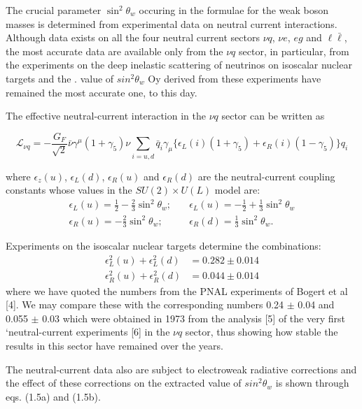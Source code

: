 The crucial parameter $\sin^{2} \theta_{w}$  occuring in the formulae for the weak boson
masses is determined from experimental data on neutral current interactions.
Although data exists on all the four neutral current sectors $\nu {q}$, $\nu {e}$, $e {g}$ and $\ell \bar{\ell}$,
the most accurate data are available only from the $\nu {q}$ sector, in particular,
from the experiments on the deep inelastic scattering of neutrinos on isoscalar
nuclear targets and the . value of $sin^{2} \theta_{w}$ Oy derived from these experiments have remained the most accurate one, to this day.


The effective neutral-current interaction in the $\nu q$ sector can be written as 

\begin{equation*}
 \mathcal{L}_{\nu q} = - \frac{G_{F}}{\sqrt{2}} \bar{\nu} \gamma^{\mu} (1 + \gamma_{5}) \nu \sum_{i=u, d} \bar{q}_{i} \gamma_{\mu} \{\epsilon_{L} (i)(1 + \gamma_{5}) + \epsilon_{R}(i)(1-\gamma_{5})\}q_{i}\tag{4.1}
\end{equation*}

where $\epsilon_{z}(u)$, $\epsilon_{L}(d)$, $\epsilon_{R}(u)$ and $\epsilon_{R}(d)$ are the neutral-current coupling constants
whose values in the $SU(2) \times U(L)$ model are:
\begin{align*}
\epsilon_{L}(u) = \frac{1}{2} - \frac{2}{3} \sin^{2} \theta_{w}; &\quad \epsilon_{L}(u) = -\frac{1}{2} + \frac{1}{3}\sin^{2} \theta_{w}\\
\epsilon_{R}(u) = - \frac{2}{3} \sin^{2} \theta_{w}; &\quad \epsilon_{R}(d) = \frac{1}{3} \sin^{2} \theta_{w}.\tag{4.2}
\end{align*}

Experiments on the isoscalar nuclear targets determine the combinations: 
\begin{align*}
\epsilon_{L}^{2}(u) + \epsilon_{L}^{2}(d) & = 0.282 \pm 0.014\\
\epsilon_{R}^{2}(u) + \epsilon_{R}^{2}(d) & = 0.044 \pm 0.014
\end{align*} 
where we have quoted the numbers from the PNAL experiments of Bogert et
al [4]. We may compare these with the corresponding numbers 0.24 $\pm$ 0.04 and
0.055 $\pm$ 0.03 which were obtained in 1973 from the analysis [5] of the very first
‘neutral-current experiments [6] in the $\nu q$ sector, thus showing how stable the
results in this sector have remained over the years. 

The neutral-current data also are subject to electroweak radiative corrections and the effect of these corrections on the extracted value of $sin^{2}\theta_{w}$  is shown through eqs. (1.5a) and (1.5b). 

